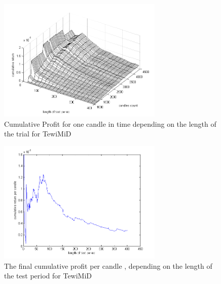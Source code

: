 \documentclass{tewiart}
\begin{document}
\begin{figure}[h!]
\begin{center}
\includegraphics[width=0.7\textwidth]{pictures/cumulativeReturnsPerCandleD.png}
\caption{Cumulative Profit for one candle in time depending on the length of the trial for TewiMiD}
\label{Cum3DPerCMiD}
\end{center}
\end{figure}
\FloatBarrier

\begin{figure}[h!]
\begin{center}
\includegraphics[width=0.7\textwidth]{pictures/mid_percandle_end.png}
\caption{The final cumulative profit per candle , depending on the length of the test period for TewiMiD}
\label{Cum3DPerCMiDend}
\end{center}
\end{figure}
\FloatBarrier
\end{document}
